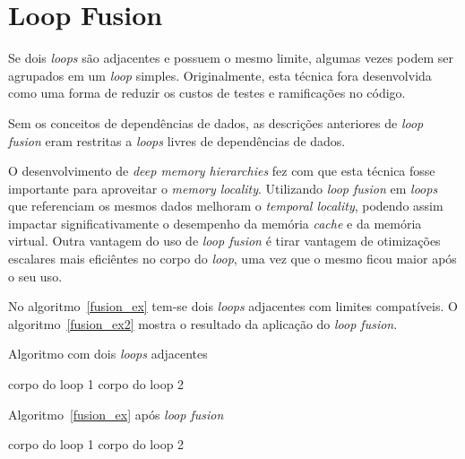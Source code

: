 
\section{Loop Fusion}

Se dois \textit{loops} são adjacentes e possuem o mesmo limite, algumas vezes
podem ser agrupados em um \textit{loop} simples.
Originalmente, esta técnica fora desenvolvida como uma forma de reduzir os
custos de testes e ramificações no código.

Sem os conceitos de dependências de dados, as descrições anteriores de
\textit{loop fusion} eram restritas a \textit{loops} livres de dependências de
dados. 

O desenvolvimento de \textit{deep memory hierarchies} fez com que esta técnica
fosse importante para aproveitar o \textit{memory locality}.
Utilizando \textit{loop fusion} em \textit{loops} que referenciam os mesmos
dados melhoram o \textit{temporal locality}, podendo assim impactar 
significativamente o desempenho da memória \textit{cache} e da memória virtual.
Outra vantagem do uso de \textit{loop fusion} é tirar vantagem de otimizações 
escalares mais eficiêntes no corpo do \textit{loop}, uma vez que o mesmo ficou
maior após o seu uso.

No algoritmo~\ref{fusion_ex} tem-se dois \textit{loops} adjacentes com limites
compatíveis. 
O algoritmo~\ref{fusion_ex2} mostra o resultado da aplicação do 
\textit{loop fusion}.

\begin{algorithm}
\caption{Algoritmo com dois \textit{loops} adjacentes}
\label{fusion_ex}
\begin{algorithmic}[1]

\STATE corpo do loop 1
\ENDFOR
{}
\STATE corpo do loop 2
\ENDFOR

\end{algorithmic}
\end{algorithm}

\begin{algorithm}
\caption{Algoritmo~\ref{fusion_ex} após \textit{loop fusion}}
\label{fusion_ex2}
\begin{algorithmic}[1]

\STATE corpo do loop 1
\STATE corpo do loop 2
\ENDFOR

\end{algorithmic}
\end{algorithm}

